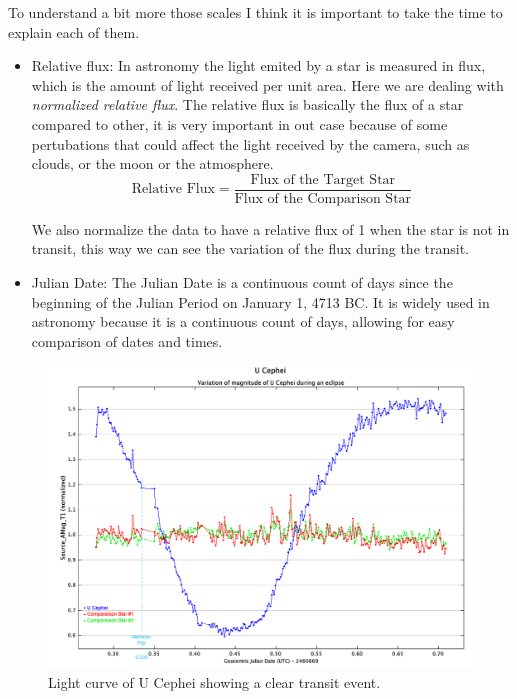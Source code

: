 \documentclass[12pt,a4paper]{article}
\begin{document}
To understand a bit more those scales I think it is important to take the time to explain each of them.
\begin{itemize}
    \item Relative flux: In astronomy the light emited by a star is measured in flux, which is the amount of light received per unit area. Here we are dealing with \textit{normalized relative flux}. 
    The relative flux is basically the flux of a star compared to other, it is very important in out case because of some pertubations that could affect the light received by the camera, such as clouds, or the moon or the atmosphere.
    \begin{equation}
        \text{Relative Flux} = \frac{\text{Flux of the Target Star}}{\text{Flux of the Comparison Star}}
    \end{equation}

    We also normalize the data to have a relative flux of 1 when the star is not in transit, this way we can see the variation of the flux during the transit.
    \item Julian Date: The Julian Date is a continuous count of days since the beginning of the Julian Period on January 1, 4713 BC. 
    It is widely used in astronomy because it is a continuous count of days, allowing for easy comparison of dates and times.
\end{itemize}


\begin{figure}[h]
    \centering
    \includegraphics[width=1\textwidth]{assets/Measurements.png}
    \caption{Light curve of U Cephei showing a clear transit event.}
    \label{fig:light_curve}
\end{figure}
\end{document}
